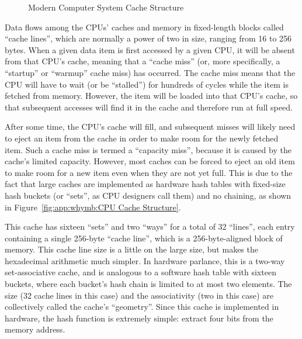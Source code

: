 \begin{figure}[htb]
\begin{center}
\end{center}
\caption{Modern Computer System Cache Structure}
\label{fig:app:whymb:Modern Computer System Cache Structure}
\end{figure}

Data flows among the CPUs' caches and memory in fixed-length blocks
called ``cache lines'', which are normally a power of two in size,
ranging from 16 to 256 bytes.
When a given data item is first accessed by a given CPU, it will
be absent from that CPU's cache, meaning that a ``cache miss''
(or, more specifically, a ``startup'' or ``warmup'' cache miss)
has occurred.
The cache miss means that the CPU will
have to wait (or be ``stalled'') for hundreds of cycles while the
item is fetched from memory.
However, the item will be loaded into that CPU's cache, so that
subsequent accesses will find it in the cache and therefore run
at full speed.

After some time, the CPU's cache will fill, and subsequent
misses will likely need to eject an item from the cache in order
to make room for the newly fetched item.
Such a cache miss is termed a ``capacity miss'', because it is caused
by the cache's limited capacity.
However, most caches can be forced to eject an old item to make room
for a new item even when they are not yet full.
This is due to the fact that large caches are implemented as hardware
hash tables with fixed-size hash buckets (or ``sets'', as CPU designers
call them) and no chaining, as shown in
Figure~\ref{fig:app:whymb:CPU Cache Structure}.

This cache has sixteen ``sets'' and two ``ways'' for a total of 32
``lines'', each entry containing a single 256-byte ``cache line'',
which is a 256-byte-aligned block of memory.
This cache line size is a little on the large size, but makes the hexadecimal
arithmetic much simpler.
In hardware parlance, this is a two-way set-associative cache, and
is analogous to a software hash table with
sixteen buckets, where each bucket's hash chain is limited to
at most two elements.
The size (32 cache lines in this case) and the associativity (two in
this case) are collectively called the cache's ``geometry''.
Since this cache is implemented in hardware, the hash function is
extremely simple: extract four bits from the memory address.

